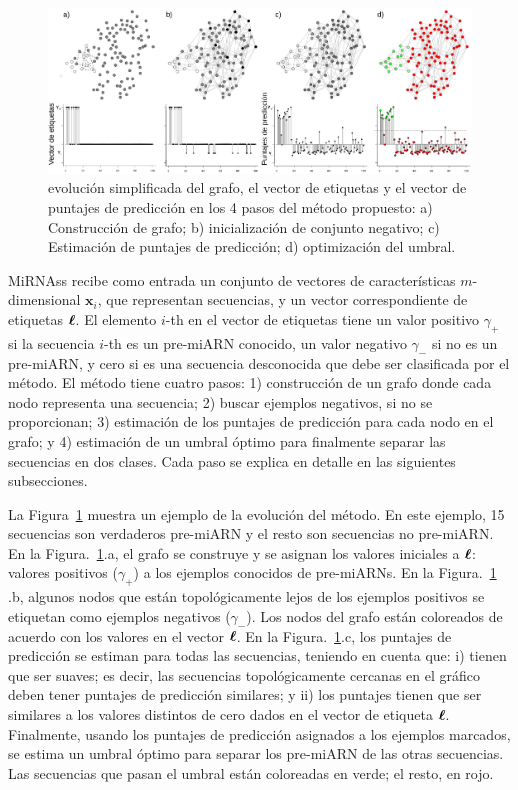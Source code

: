 \begin{figure}[tpb]
	\centering
	\includegraphics[width=\linewidth]{fig/workflow.eps}
	\caption[Evolución del grafo]{evolución simplificada del grafo, el vector de etiquetas y el vector de puntajes de predicción en los 4 pasos del método
	propuesto: a) Construcción de grafo; b) inicialización de conjunto negativo; c) Estimación de puntajes de predicción; d) optimización del umbral.}
	\label{fig:workflow}
\end{figure}

MiRNAss recibe como entrada un conjunto de vectores de características $m$-dimensional $\mathbf{x}_{i}$, que representan secuencias, y un vector
correspondiente de etiquetas $\boldsymbol\ell$. El elemento $i$-th en el vector de etiquetas tiene un valor positivo $\gamma_{+}$ si la secuencia $i$-th es un pre-miARN
conocido, un valor negativo $\gamma_{-}$ si no es un pre-miARN, y cero si es una secuencia desconocida que debe ser clasificada por el método. El método
tiene cuatro pasos: 1) construcción de un grafo donde cada nodo representa una secuencia; 2) buscar ejemplos negativos, si no se proporcionan; 3) estimación
de los puntajes de predicción para cada nodo en el grafo; y 4) estimación de un umbral óptimo para finalmente separar las secuencias en dos clases. Cada
paso se explica en detalle en las siguientes subsecciones.

La Figura~\ref{fig:workflow} muestra un ejemplo de la evolución del método. En este ejemplo, 15 secuencias son verdaderos pre-miARN y el resto son secuencias
no pre-miARN. En la Figura.~\ref{fig:workflow}.a, el grafo se construye y se asignan los valores iniciales a $\boldsymbol\ell$: valores positivos ($\gamma_{+}$) a los
ejemplos conocidos de pre-miARNs. En la Figura.~\ref{fig:workflow} .b, algunos nodos que están topológicamente lejos de los ejemplos positivos se etiquetan como
ejemplos negativos ($\gamma_{-}$). Los nodos del grafo están coloreados de acuerdo con los valores en el vector $\boldsymbol\ell$. En la Figura.~\ref{fig:workflow}.c,
los puntajes de predicción se estiman para todas las secuencias, teniendo en cuenta que: i) tienen que ser suaves; es decir, las secuencias topológicamente
cercanas en el gráfico deben tener puntajes de predicción similares; y ii) los puntajes tienen que ser similares a los valores distintos de cero dados en el
vector de etiqueta $\boldsymbol\ell$. Finalmente, usando los puntajes de predicción asignados a los ejemplos marcados, se estima un umbral óptimo para separar los
pre-miARN de las otras secuencias. Las secuencias que pasan el umbral están coloreadas en verde; el resto, en rojo.

